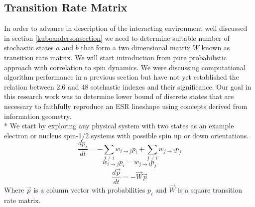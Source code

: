 \subsection{Transition Rate Matrix}\label{trmsection}
In order to advance in description of the interacting environment well discussed in section \ref{kuboandersonsection} we need to determine suitable number of stochastic states $a$ and $b$ that form a two dimensional matrix $W$ known as transition rate matrix. We will start introduction from pure probabilistic approach with correlation to spin dynamics. We were discussing computational algorithm performance in a previous section but have not yet established the relation between 2,6 and 48 sotchastic indexes and their significance. Our goal in this research work was to determine lower bound of discrete states that are necessary to faithfully reproduce an ESR lineshape using concepts derived from information geometry\cite{Earle2009}.\\*
We start by exploring any physical system with two states as an example electron or nucleus spin-1/2 systems with possible spin up or down orientations.   
\begin{equation}\label{eq:master}
\frac{dp_{i}}{dt}=-\sum_{j\neq i}w_{i\rightarrow j}p_{i}+\sum_{j\neq i}w_{j\rightarrow i}p_{j}
\end{equation}   
\begin{equation}\label{eq:masterbal}
w_{i\rightarrow j}p_{i}=w_{j\rightarrow i}p_{j}
\end{equation} 
\begin{equation}\label{eq:matrix}
\frac{d\vec{p}}{dt}=-\vec{W}\vec{p}
\end{equation} 
Where $\vec{p}$ is a column vector with probabilities $p_i$ and $\vec{W}$ is a square transition rate matrix.

